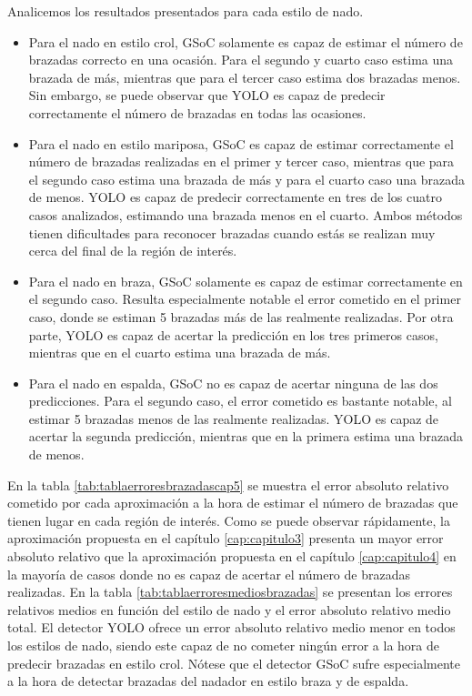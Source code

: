 Analicemos los resultados presentados para cada estilo de nado. 
\begin{itemize}
    \item Para el nado en estilo crol, GSoC solamente es capaz de estimar el número de brazadas correcto en una ocasión. Para el segundo y cuarto caso estima una brazada de más, mientras que para el tercer caso estima dos brazadas menos. Sin embargo, se puede observar que YOLO es capaz de predecir correctamente el número de brazadas en todas las ocasiones.
    
    \item Para el nado en estilo mariposa, GSoC es capaz de estimar correctamente el número de brazadas realizadas en el primer y tercer caso, mientras que para el segundo caso estima una brazada de más y para el cuarto caso una brazada de menos. YOLO es capaz de predecir correctamente en tres de los cuatro casos analizados, estimando una brazada menos en el cuarto. Ambos métodos tienen dificultades para reconocer brazadas cuando estás se realizan muy cerca del final de la región de interés.
    
    \item Para el nado en braza, GSoC solamente es capaz de estimar correctamente en el segundo caso. Resulta especialmente notable el error cometido en el primer caso, donde se estiman 5 brazadas más de las realmente realizadas. Por otra parte, YOLO es capaz de acertar la predicción en los tres primeros casos, mientras que en el cuarto estima una brazada de más.
    
    \item Para el nado en espalda, GSoC no es capaz de acertar ninguna de las dos predicciones. Para el segundo caso, el error cometido es bastante notable, al estimar 5 brazadas menos de las realmente realizadas. YOLO es capaz de acertar la segunda predicción, mientras que en la primera estima una brazada de menos.
\end{itemize}

En la tabla \ref{tab:tablaerroresbrazadascap5} se muestra el error absoluto relativo cometido por cada aproximación a la hora de estimar el número de brazadas que tienen lugar en cada región de interés. Como se puede observar rápidamente, la aproximación propuesta en el capítulo \ref{cap:capitulo3} presenta un mayor error absoluto relativo que la aproximación propuesta en el capítulo \ref{cap:capitulo4} en la mayoría de casos donde no es capaz de acertar el número de brazadas realizadas. En la tabla \ref{tab:tablaerroresmediosbrazadas} se presentan los errores relativos medios en función del estilo de nado y el error absoluto relativo medio total. El detector YOLO ofrece un error absoluto relativo medio menor en todos los estilos de nado, siendo este capaz de no cometer ningún error a la hora de predecir brazadas en estilo crol. Nótese que el detector GSoC sufre especialmente a la hora de detectar brazadas del nadador en estilo braza y de espalda. 

